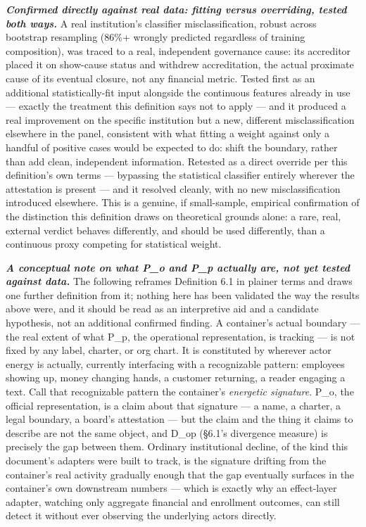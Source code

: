 \documentclass[
]{article}
\begin{document}
\emph{\textbf{Confirmed directly against real data: fitting versus
overriding, tested both ways.}} A real institution's classifier
misclassification, robust across bootstrap resampling (86\%+ wrongly
predicted regardless of training composition), was traced to a real,
independent governance cause: its accreditor placed it on show-cause
status and withdrew accreditation, the actual proximate cause of its
eventual closure, not any financial metric. Tested first as an
additional statistically-fit input alongside the continuous features
already in use --- exactly the treatment this definition says not to
apply --- and it produced a real improvement on the specific institution
but a new, different misclassification elsewhere in the panel,
consistent with what fitting a weight against only a handful of positive
cases would be expected to do: shift the boundary, rather than add
clean, independent information. Retested as a direct override per this
definition's own terms --- bypassing the statistical classifier entirely
wherever the attestation is present --- and it resolved cleanly, with no
new misclassification introduced elsewhere. This is a genuine, if
small-sample, empirical confirmation of the distinction this definition
draws on theoretical grounds alone: a rare, real, external verdict
behaves differently, and should be used differently, than a continuous
proxy competing for statistical weight.

\emph{\textbf{A conceptual note on what P\_o and P\_p actually are, not
yet tested against data.}} The following reframes Definition 6.1 in
plainer terms and draws one further definition from it; nothing here has
been validated the way the results above were, and it should be read as
an interpretive aid and a candidate hypothesis, not an additional
confirmed finding. A container's actual boundary --- the real extent of
what P\_p, the operational representation, is tracking --- is not fixed
by any label, charter, or org chart. It is constituted by wherever actor
energy is actually, currently interfacing with a recognizable pattern:
employees showing up, money changing hands, a customer returning, a
reader engaging a text. Call that recognizable pattern the container's
\emph{energetic signature}. P\_o, the official representation, is a
claim about that signature --- a name, a charter, a legal boundary, a
board's attestation --- but the claim and the thing it claims to
describe are not the same object, and D\_op (§6.1's divergence measure)
is precisely the gap between them. Ordinary institutional decline, of
the kind this document's adapters were built to track, is the signature
drifting from the container's real activity gradually enough that the
gap eventually surfaces in the container's own downstream numbers ---
which is exactly why an effect-layer adapter, watching only aggregate
financial and enrollment outcomes, can still detect it without ever
observing the underlying actors directly.
\end{document}
